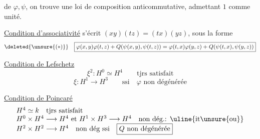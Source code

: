  de $\varphi,\psi$, on trouve une loi de composition
anticommutative, admettant $1$ comme unité.

\uline{Condition d'associativité} s'écrit $(xy)(tz)=(tx)(yz)$, sous la forme
\[
\deleted{\unsure{(*)}}\quad
\boxed{\varphi(x,y)\varphi(t,z)+Q(\psi(x,y),\psi(t,z))
=\varphi(t,x)\varphi(y,z)+Q(\psi(t,x),\psi(y,z))}
\]

\uline{Condition de Lefschetz}
\[
\xi^2:H^0\simeq H^4\qquad\text{tjrs satisfait}
\]
\[
\xi:H^1\longrightarrow H^3\qquad\text{ssi}\quad
\boxed{\varphi\text{ non dégénérée}}
\]

\uline{Condition de Poincaré}
\[
\begin{array}{l}
H^4\simeq k\quad\text{tjrs satisfait}\\
H^0\times H^4\longrightarrow H^4\text{ et }H^1\times H^3\longrightarrow H^4\quad\text{non dég.: }\uline{\text{it\unsure{ou}}}\\
H^2\times H^2\longrightarrow H^4\quad\text{non dég ssi}\quad\boxed{Q\text{ non dégénérée}}
\end{array}
\]

